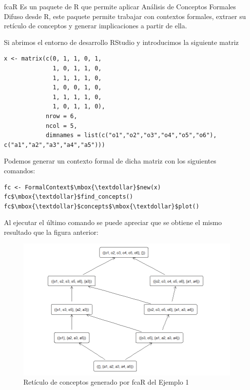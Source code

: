 \documentclass[../../main.tex]{subfiles}
\begin{document}
fcaR\cite{doc4}  Es un paquete de R que permite aplicar Análisis de Conceptos Formales Difuso desde R, este paquete permite trabajar con contextos formales, extraer su retículo de conceptos y generar implicaciones a partir de ella.

Si abrimos el entorno de desarrollo RStudio y introducimos la siguiente matriz 

\begin{lstlisting}
x <- matrix(c(0, 1, 1, 0, 1,
              1, 0, 1, 1, 0,
              1, 1, 1, 1, 0,
              1, 0, 0, 1, 0,
              1, 1, 1, 1, 0,
              1, 0, 1, 1, 0), 
            nrow = 6, 
            ncol = 5, 
            dimnames = list(c("o1","o2","o3","o4","o5","o6"), c("a1","a2","a3","a4","a5")))
\end{lstlisting}

\vskip 0.2in

Podemos generar un contexto formal de dicha matriz con los siguientes comandos:
\begin{lstlisting}[mathescape]
fc <- FormalContext$\mbox{\textdollar}$new(x)
fc$\mbox{\textdollar}$find_concepts()
fc$\mbox{\textdollar}$concepts$\mbox{\textdollar}$plot()
\end{lstlisting}

\vskip 0.2in

\newpage

Al ejecutar el último comando se puede apreciar que se obtiene el mismo resultado que la figura anterior:
\begin{figure}[h]
\centering
\includegraphics[width=1\textwidth]{images/3_fca/reticulo2.png}
\caption{Retículo de conceptos generado por fcaR del Ejemplo 1}
\end{figure}
\end{document}
